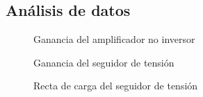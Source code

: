 \subsection{Análisis de datos}

\begin{figure}[H]
    \centering
    
    \caption{Ganancia del amplificador no inversor}
    \label{fig:2-analisis:ganancia-opamp}
\end{figure}

\begin{figure}[H]
    \centering
    
    \caption{Ganancia del seguidor de tensión}
    \label{fig:2-analisis:ganancia-seguidor}
\end{figure}

\begin{figure}[H]
    \centering
    
    \caption{Recta de carga del seguidor de tensión}
    \label{fig:2-analisis:recta-carga}
\end{figure}
